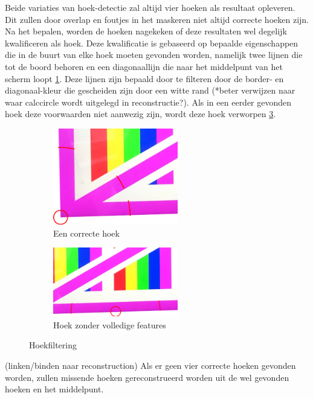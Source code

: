 Beide variaties van hoek-detectie zal altijd vier hoeken als resultaat opleveren. Dit zullen door overlap en foutjes in het maskeren niet altijd correcte hoeken zijn. Na het bepalen, worden de hoeken nagekeken of deze resultaten wel degelijk kwalificeren als hoek. Deze kwalificatie is gebaseerd op bepaalde eigenschappen die in de buurt van elke hoek moeten gevonden worden, namelijk twee lijnen die tot de boord behoren en een diagonaallijn die naar het middelpunt van het scherm loopt \ref{fig:correcte hoek}. Deze lijnen zijn bepaald door te filteren door de border- en diagonaal-kleur die gescheiden zijn door een witte rand (*beter verwijzen naar waar calccircle wordt uitgelegd in reconstructie?). Als in een eerder gevonden hoek deze voorwaarden niet aanwezig zijn, wordt deze hoek verworpen \ref{fig:foute hoek}.

\begin{figure}[H] 
\centering
\begin{subfigure}{0.5\textwidth}
\centering
\includegraphics[width=0.6\textwidth]{img/correctCorner.png}
\caption{Een correcte hoek}
\label{fig:correcte hoek}
\end{subfigure}%
\begin{subfigure}{0.5\textwidth}
\centering
\includegraphics[width=0.6\textwidth]{img/notACorner.png}
\caption{Hoek zonder volledige features}
\label{fig:foute hoek}
\end{subfigure}
\caption{Hoekfiltering}
\end{figure}
(linken/binden naar reconstruction) Als er geen vier correcte hoeken gevonden worden, zullen missende hoeken gereconstrueerd worden uit de wel gevonden hoeken en het middelpunt.